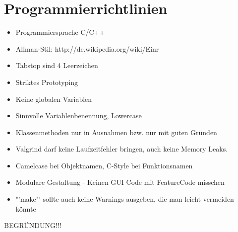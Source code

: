 \chapter{Programmierrichtlinien}

\renewcommand{\labelitemi}{•}
\begin{itemize}
	\item Programmiersprache C/C++
	\item Allman-Stil: http://de.wikipedia.org/wiki/Einr%
	\item Tabstop sind 4 Leerzeichen
	\item Striktes Prototyping
	\item Keine globalen Variablen
	\item Sinnvolle Variablenbenennung, Lowercase
	\item Klassenmethoden nur in Ausnahmen bzw. nur mit guten Gründen
	\item Valgrind darf keine Laufzeitfehler bringen, auch keine Memory Leaks.
	\item Camelcase bei Objektnamen, C-Style bei Funktionsnamen
	\item Modulare Gestaltung - Keinen GUI Code mit FeatureCode misschen
	\item "'make"' sollte auch keine Warnings ausgeben, die man leicht vermeiden könnte
\end{itemize}

BEGRÜNDUNG!!!